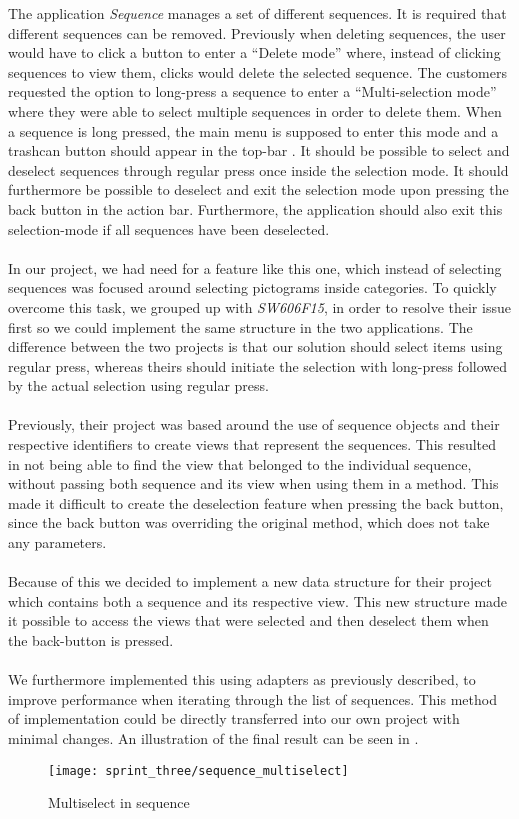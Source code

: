The application \emph{Sequence} manages a set of different sequences. It is required that different sequences can be removed. Previously when deleting sequences, the user would have to click a button to enter a ``Delete mode'' where, instead of clicking sequences to view them, clicks would delete the selected sequence. The customers requested the option to long-press a sequence to enter a ``Multi-selection mode'' where they were able to select multiple sequences in order to delete them. When a sequence is long pressed, the main menu is supposed to enter this mode and a trashcan button should appear in the top-bar \parencite{android_guidelines_longpress}. It should be possible to select and deselect sequences through regular press once inside the selection mode. It should furthermore be possible to deselect and exit the selection mode upon pressing the back button in the action bar.  Furthermore, the application should also exit this selection-mode if all sequences have been deselected. 
\\\\
In our project, we had need for a feature like this one, which instead of selecting sequences was focused around selecting pictograms inside categories. To quickly overcome this task, we grouped up with \emph{SW606F15}, in order to resolve their issue first so we could implement the same structure in the two applications. The difference between the two projects is that our solution should select items using regular press, whereas theirs should initiate the selection with long-press followed by the actual selection using regular press.
\\\\
Previously, their project was based around the use of sequence objects and their respective identifiers to create views that represent the sequences. This resulted in not being able to find the view that belonged to the individual sequence, without passing both sequence and its view when using them in a method. This made it difficult to create the deselection feature when pressing the back button, since the back button was overriding the original  method, which does not take any parameters.
\\\\ 
Because of this we decided to implement a new data structure for their project which contains both a sequence and its respective view. This new structure made it possible to access the views that were selected and then deselect them when the back-button is pressed. 
\\\\
We furthermore implemented this using adapters as previously described, to improve performance when iterating through the list of sequences. This method of implementation could be directly transferred into our own project with minimal changes. An illustration of the final result can be seen in .

\begin{figure}[!htbp]
	\centering
	\texttt{[image: sprint\_three/sequence\_multiselect]}
	\caption{Multiselect in sequence}
	\label{fig:sequence_multiselect}
\end{figure}